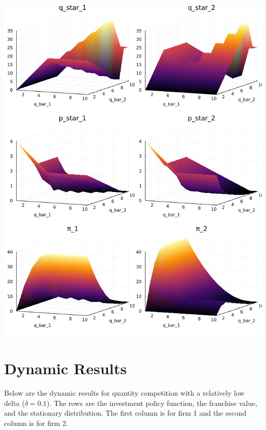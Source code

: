 \documentclass{article}
\begin{document}
\includegraphics[scale=.65]{p_static.png}

\pagebreak

\section*{Dynamic Results}

Below are the dynamic results for quantity competition with a relatively low delta ($\delta = 0.1$).  The rows are the investment policy function, the franchise value, and the stationary distribution.  The first column is for firm 1 and the second column is for firm 2.
\end{document}
